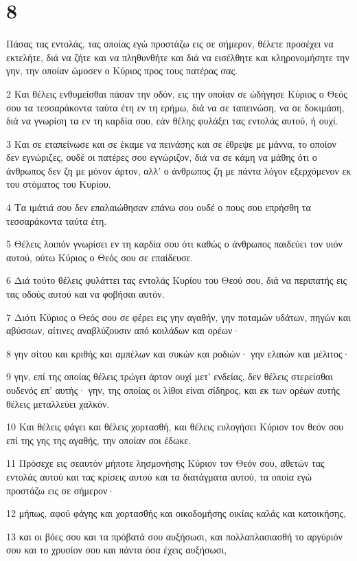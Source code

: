 \chapter{8}

\par Πάσας τας εντολάς, τας οποίας εγώ προστάζω εις σε σήμερον, θέλετε προσέχει να εκτελήτε, διά να ζήτε και να πληθυνθήτε και διά να εισέλθητε και κληρονομήσητε την γην, την οποίαν ώμοσεν ο Κύριος προς τους πατέρας σας.
\par 2 Και θέλεις ενθυμείσθαι πάσαν την οδόν, εις την οποίαν σε ώδήγησε Κύριος ο Θεός σου τα τεσσαράκοντα ταύτα έτη εν τη ερήμω, διά να σε ταπεινώση, να σε δοκιμάση, διά να γνωρίση τα εν τη καρδία σου, εάν θέλης φυλάξει τας εντολάς αυτού, ή ουχί.
\par 3 Και σε εταπείνωσε και σε έκαμε να πεινάσης και σε έθρεψε με μάννα, το οποίον δεν εγνώριζες, ουδέ οι πατέρες σου εγνώριζον, διά να σε κάμη να μάθης ότι ο άνθρωπος δεν ζη με μόνον άρτον, αλλ' ο άνθρωπος ζη με πάντα λόγον εξερχόμενον εκ του στόματος του Κυρίου.
\par 4 Τα ιμάτιά σου δεν επαλαιώθησαν επάνω σου ουδέ ο πους σου επρήσθη τα τεσσαράκοντα ταύτα έτη.
\par 5 Θέλεις λοιπόν γνωρίσει εν τη καρδία σου ότι καθώς ο άνθρωπος παιδεύει τον υιόν αυτού, ούτω Κύριος ο Θεός σου σε επαίδευσε.
\par 6 Διά τούτο θέλεις φυλάττει τας εντολάς Κυρίου του Θεού σου, διά να περιπατής εις τας οδούς αυτού και να φοβήσαι αυτόν.
\par 7 Διότι Κύριος ο Θεός σου σε φέρει εις γην αγαθήν, γην ποταμών υδάτων, πηγών και αβύσσων, αίτινες αναβλύζουσιν από κοιλάδων και ορέων·
\par 8 γην σίτου και κριθής και αμπέλων και συκών και ροδιών· γην ελαιών και μέλιτος·
\par 9 γην, επί της οποίας θέλεις τρώγει άρτον ουχί μετ' ενδείας, δεν θέλεις στερείσθαι ουδενός επ' αυτής· γην, της οποίας οι λίθοι είναι σίδηρος, και εκ των ορέων αυτής θέλεις μεταλλεύει χαλκόν.
\par 10 Και θέλεις φάγει και θέλεις χορτασθή, και θέλεις ευλογήσει Κύριον τον θεόν σου επί της γης της αγαθής, την οποίαν σοι έδωκε.
\par 11 Πρόσεχε εις σεαυτόν μήποτε λησμονήσης Κύριον τον Θεόν σου, αθετών τας εντολάς αυτού και τας κρίσεις αυτού και τα διατάγματα αυτού, τα οποία εγώ προστάζω εις σε σήμερον·
\par 12 μήπως, αφού φάγης και χορτασθής και οικοδομήσης οικίας καλάς και κατοικήσης,
\par 13 και οι βόες σου και τα πρόβατά σου αυξήσωσι, και πολλαπλασιασθή το αργύριόν σου και το χρυσίον σου και πάντα όσα έχεις αυξήσωσι,
